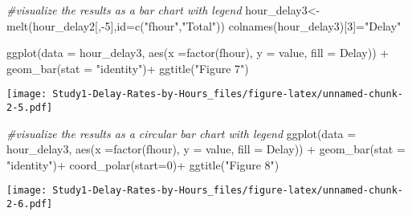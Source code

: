 \documentclass[
]{article}
\newenvironment{Shaded}{\begin{snugshade}}{\end{snugshade}}
\newcommand{\AttributeTok}[1]{\textcolor[rgb]{0.77,0.63,0.00}{#1}}
\newcommand{\CommentTok}[1]{\textcolor[rgb]{0.56,0.35,0.01}{\textit{#1}}}
\newcommand{\DecValTok}[1]{\textcolor[rgb]{0.00,0.00,0.81}{#1}}
\newcommand{\FunctionTok}[1]{\textcolor[rgb]{0.00,0.00,0.00}{#1}}
\newcommand{\NormalTok}[1]{#1}
\newcommand{\OtherTok}[1]{\textcolor[rgb]{0.56,0.35,0.01}{#1}}
\newcommand{\SpecialCharTok}[1]{\textcolor[rgb]{0.00,0.00,0.00}{#1}}
\newcommand{\StringTok}[1]{\textcolor[rgb]{0.31,0.60,0.02}{#1}}
\begin{document}
\begin{Shaded}
\begin{Highlighting}[]
\CommentTok{\#visualize the results as a bar chart with legend}
\NormalTok{hour\_delay3}\OtherTok{\textless{}{-}}\FunctionTok{melt}\NormalTok{(hour\_delay2[,}\SpecialCharTok{{-}}\DecValTok{5}\NormalTok{],}\AttributeTok{id=}\FunctionTok{c}\NormalTok{(}\StringTok{"fhour"}\NormalTok{,}\StringTok{"Total"}\NormalTok{))}
\FunctionTok{colnames}\NormalTok{(hour\_delay3)[}\DecValTok{3}\NormalTok{]}\OtherTok{=}\StringTok{"Delay"}

\FunctionTok{ggplot}\NormalTok{(}\AttributeTok{data =}\NormalTok{ hour\_delay3, }\FunctionTok{aes}\NormalTok{(}\AttributeTok{x =}\FunctionTok{factor}\NormalTok{(fhour), }\AttributeTok{y =}\NormalTok{ value, }\AttributeTok{fill =}\NormalTok{ Delay)) }\SpecialCharTok{+} 
  \FunctionTok{geom\_bar}\NormalTok{(}\AttributeTok{stat =} \StringTok{"identity"}\NormalTok{)}\SpecialCharTok{+}
  \FunctionTok{ggtitle}\NormalTok{(}\StringTok{"Figure 7"}\NormalTok{)}
\end{Highlighting}
\end{Shaded}

\texttt{[image: Study1-Delay-Rates-by-Hours\_files/figure-latex/unnamed-chunk-2-5.pdf]}

\begin{Shaded}
\begin{Highlighting}[]
\CommentTok{\#visualize the results as a circular bar chart with legend}
\FunctionTok{ggplot}\NormalTok{(}\AttributeTok{data =}\NormalTok{ hour\_delay3, }\FunctionTok{aes}\NormalTok{(}\AttributeTok{x =}\FunctionTok{factor}\NormalTok{(fhour), }\AttributeTok{y =}\NormalTok{ value, }\AttributeTok{fill =}\NormalTok{ Delay)) }\SpecialCharTok{+} 
  \FunctionTok{geom\_bar}\NormalTok{(}\AttributeTok{stat =} \StringTok{"identity"}\NormalTok{)}\SpecialCharTok{+}
  \FunctionTok{coord\_polar}\NormalTok{(}\AttributeTok{start=}\DecValTok{0}\NormalTok{)}\SpecialCharTok{+}
  \FunctionTok{ggtitle}\NormalTok{(}\StringTok{"Figure 8"}\NormalTok{)}
\end{Highlighting}
\end{Shaded}

\texttt{[image: Study1-Delay-Rates-by-Hours\_files/figure-latex/unnamed-chunk-2-6.pdf]}
\end{document}
